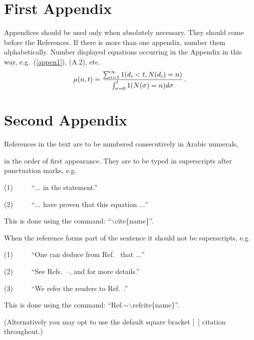 \documentclass{ws-rv9x6}
\begin{document}
\appendix

\section{First Appendix}

\renewcommand{\theequation}{A.\arabic{equation}}

Appendices should be used only when absolutely necessary. They
should come before the References. If there is more than one
appendix, number them alphabetically. Number displayed equations
occurring in the Appendix in this way, e.g.~(\ref{appen1}), (A.2),
etc.
\begin{equation}
\mu(n, t) = {\sum^\infty_{i=1} 1(d_i < t, N(d_i) = n) \over
\int^t_{\sigma=0} 1(N(\sigma) = n)d\sigma}\,. \label{appen1}
\end{equation}

\section{Second Appendix}

\renewcommand{\theequation}{B.\arabic{equation}}

References in the text are to be numbered consecutively in Arabic
numerals,\break
\eject

\noindent
in the order of first appearance. They are to be typed in 
superscripts after punctuation marks, e.g.

(1) $ \qquad $ ``$\ldots$ in the statement.\cite{6}''

(2) $ \qquad $ ``$\ldots$ have proven\cite{6} 
that this equation $\ldots$''

\noindent
This is done using the command: ``$\backslash$cite\{name\}''. 

When the reference forms part of the sentence it should not 
be superscripts, e.g.

(1) $ \qquad $  ``One can deduce from Ref.~ that $\ldots$''

(2) $ \qquad $  ``See Refs.~--,  
and  for more details.'' 

(3) $ \qquad $  ``We refer the readers to Ref.~.''

\noindent
This is done using the command: ``Ref.$\sim$$\backslash$refcite\{name\}''.

\vspace*{8pt}
\noindent
(Alternatively you may opt to use the default square bracket [\ ] 
citation throughout.)
\end{document}
